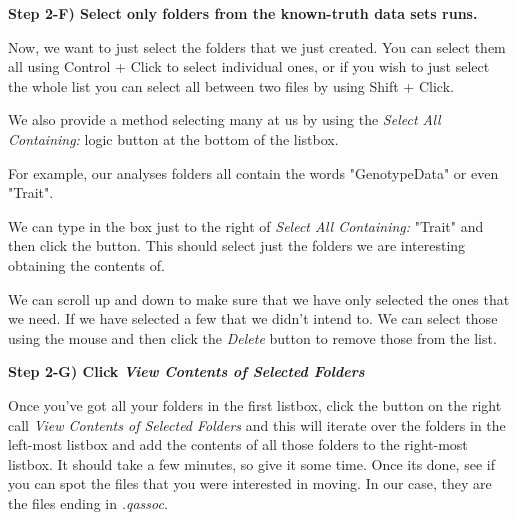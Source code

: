 \documentclass[twoside,a4paper]{refart}
\begin{document}
\textbf{Step 2-F) Select only folders from the known-truth data sets runs.}

Now, we want to just select the folders that we just created. You can select them all using Control + Click to select individual ones, or if you wish to just select the whole list you can select all between two files by using Shift + Click. 

We also provide a method selecting many at us by using the \textit{Select All Containing:} logic button at the bottom of the listbox.

For example, our analyses folders all contain the words "GenotypeData" or even "Trait". 

We can type in the box just to the right of \textit{Select All Containing:} "Trait" and then click the button. This should select just the folders we are interesting obtaining the contents of.

We can scroll up and down to make sure that we have only selected the ones that we need. If we have selected a few that we didn't intend to. We can select those using the mouse and then click the \textit{Delete} button to remove those from the list.

\begin{center}
\end{center}

\textbf{Step 2-G) Click \textit{View Contents of Selected Folders}}

Once you've got all your folders in the first listbox, click the button on the right call \textit{View Contents of Selected Folders} and this will iterate over the folders in the left-most listbox and add the contents of all those folders to the right-most listbox. It should take a few minutes, so give it some time. Once its done, see if you can spot the files that you were interested in moving. In our case, they are the files ending in \textit{.qassoc}.
\end{document}

